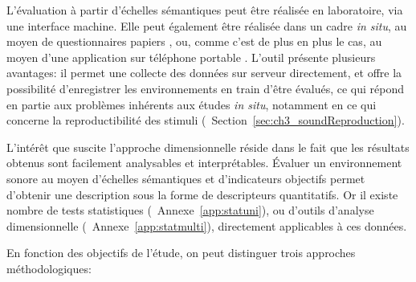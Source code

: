 L'évaluation à partir d'échelles sémantiques peut être réalisée en laboratoire, via une interface machine. Elle peut également être réalisée dans un cadre \emph{in situ}, au moyen de questionnaires papiers \citep{jeon2013soundwalk,torija2013application}, ou, comme c'est de plus en plus le cas, au moyen d'une application sur téléphone portable \citep{kardous2014evaluation,ricciardi2015sound}. L'outil présente plusieurs avantages: il permet une collecte des données sur serveur directement, et offre la possibilité d'enregistrer les environnements en train d'être évalués, ce qui répond en partie aux problèmes inhérents aux études \emph{in situ}, notamment en ce qui concerne la reproductibilité des stimuli (\cf~Section~\ref{sec:ch3_soundReproduction}).

L'intérêt que suscite l'approche dimensionnelle réside dans le fait que les résultats obtenus sont facilement analysables et interprétables. Évaluer un environnement sonore au moyen d'échelles sémantiques et d'indicateurs objectifs permet d'obtenir une description sous la forme de descripteurs quantitatifs. Or il existe nombre de tests statistiques (\cf~Annexe~\ref{app:statuni}), ou d'outils d'analyse dimensionnelle (\cf~Annexe~\ref{app:statmulti}), directement applicables à ces données.

En fonction des objectifs de l'étude, on peut distinguer trois approches méthodologiques:

